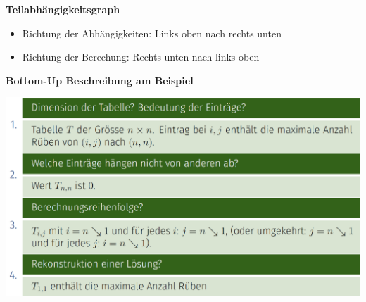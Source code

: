 \begin{sectionbox}
\textbf{Teilabhängigkeitsgraph}\par
\begin{itemize}
    \item Richtung der Abhängigkeiten: Links oben nach rechts unten
    \item Richtung der Berechung: Rechts unten nach links oben
\end{itemize}\vspace{7px}

\textbf{Bottom-Up Beschreibung am Beispiel}\par
\begin{center}
    \includegraphics[width = \columnwidth]{../img/kanTable.png}
\end{center}\smallskip

\end{sectionbox}

